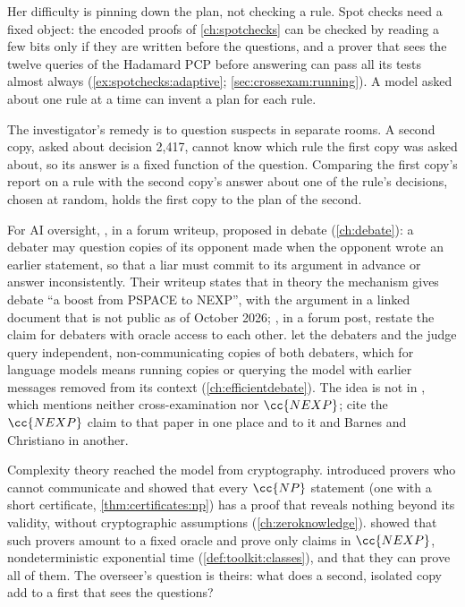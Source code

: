 \begin{refsection}
Her difficulty is pinning down the plan, not checking a rule. Spot checks need a fixed object: the encoded proofs of \cref{ch:spotchecks} can be checked by reading a few bits only if they are written before the questions, and a prover that sees the twelve queries of the Hadamard PCP before answering can pass all its tests almost always (\cref{ex:spotchecks:adaptive}; \cref{sec:crossexam:running}). A model asked about one rule at a time can invent a plan for each rule.

The investigator's remedy is to question suspects in separate rooms. A second copy, asked about decision 2{,}417, cannot know which rule the first copy was asked about, so its answer is a fixed function of the question. Comparing the first copy's report on a rule with the second copy's answer about one of the rule's decisions, chosen at random, holds the first copy to the plan of the second.

For AI oversight, \textcite{BarnesChristiano2020}, in a forum writeup, proposed  in debate (\cref{ch:debate}): a debater may question copies of its opponent made when the opponent wrote an earlier statement, so that a liar must commit to its argument in advance or answer inconsistently. Their writeup states that in theory the mechanism gives debate ``a boost from PSPACE to NEXP'', with the argument in a linked document that is not public as of October 2026; \textcite{IrvingMarshall2025}, in a forum post, restate the claim for debaters with oracle access to each other. \Textcite{BrownCohenEtAl2024} let the debaters and the judge query independent, non-communicating copies of both debaters, which for language models means running copies or querying the model with earlier messages removed from its context (\cref{ch:efficientdebate}). The idea is not in \textcite{IrvingEtAl2018}, which mentions neither cross-examination nor $\cc{NEXP}$; \textcite{BuhlEtAl2025} cite the $\cc{NEXP}$ claim to that paper in one place and to it and Barnes and Christiano in another.

Complexity theory reached the model from cryptography. \Textcite{BenOrEtAl1988} introduced provers who cannot communicate and showed that every $\cc{NP}$ statement (one with a short certificate, \cref{thm:certificates:np}) has a proof that reveals nothing beyond its validity, without cryptographic assumptions (\cref{ch:zeroknowledge}). \Textcite{FortnowRompelSipser1994} showed that such provers amount to a fixed oracle and prove only claims in $\cc{NEXP}$, nondeterministic exponential time (\cref{def:toolkit:classes}), and \textcite{BabaiFortnowLund1991} that they can prove all of them. The overseer's question is theirs: what does a second, isolated copy add to a first that sees the questions?


\end{refsection}

